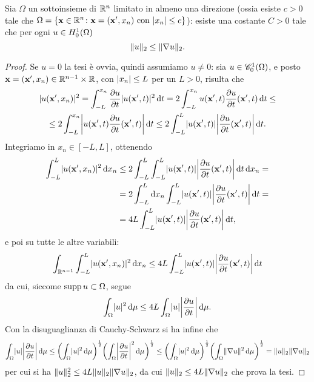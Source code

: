 \begin{teorema} \label{t:disuguaglianza-poincare}
    Sia $\Omega$ un sottoinsieme di $\R^n$ limitato in almeno una direzione (ossia esiste $c>0$ tale che $\Omega=\{\vec x\in\R^n\colon\vec x=(\vec x',x_n)\text{ con }\abs{x_n}\le c\}$): esiste una costante $C>0$ tale che per ogni $u\in\sobHc[1]{\Omega}$
    \begin{equation}
        \norm{u}_2\le\norm{\grad u}_2.
        \label{eq:disuguaglianza-poincare}
    \end{equation}
\end{teorema}
\begin{proof}
    Se $u=0$ la tesi è ovvia, quindi assumiamo $u\ne 0$: sia $u\in\contsc[1]{\Omega}$, e posto $\vec x=(\vec x',x_n)\in\R^{n-1}\times\R$, con $\abs{x_n}\le L$ per un $L>0$, risulta che
    \begin{multline}
        \abs{u(\vec x',x_n)}^2=
        \int_{-L}^{x_n}\drp{u}{t}\abs{u(\vec x',t)}^2\,\dd t=
        2\int_{-L}^{x_n}u(\vec x',t)\drp{u}{t}(\vec x',t)\,\dd t\le\\ \le
        2\int_{-L}^{x_n}\abs[\bigg]{u(\vec x',t)\drp{u}{t}(\vec x',t)}\,\dd t\le
        2\int_{-L}^L\abs{u(\vec x',t)}\abs[\bigg]{\drp{u}{t}(\vec x',t)}\,\dd t.
    \end{multline}
    Integriamo in $x_n\in[-L,L]$, ottenendo
    \begin{equation}
        \begin{split}
            \int_{-L}^L\abs{u(\vec x',x_n)}^2\,\dd x_n&\le
            2\int_{-L}^L\int_{-L}^L\abs{u(\vec x',t)}\abs[\bigg]{\drp{u}{t}(\vec x',t)}\,\dd t\,\dd x_n=\\ &=
            2\int_{-L}^L\dd x_n \int_{-L}^L\abs{u(\vec x',t)}\abs[\bigg]{\drp{u}{t}(\vec x',t)}\,\dd t=\\ &=
            4L\int_{-L}^L\abs{u(\vec x',t)}\abs[\bigg]{\drp{u}{t}(\vec x',t)}\,\dd t,
        \end{split}
    \end{equation}
    e poi su tutte le altre variabili:
    \begin{equation}
        \int_{\R^{n-1}}\int_{-L}^L\abs{u(\vec x',x_n)}^2\,\dd x_n\le 4L\int_{-L}^L\abs{u(\vec x',t)}\abs[\bigg]{\drp{u}{t}(\vec x',t)}\,\dd t
    \end{equation}
    da cui, siccome $\supp u\subset\Omega$, segue
    \begin{equation}
        \int_\Omega\abs{u}^2\,\dd\mu\le 4L\int_\Omega\abs{u}\abs[\bigg]{\drp{u}{t}}\,\dd\mu.
    \end{equation}
    Con la disuguaglianza di Cauchy-Schwarz si ha infine che
    \begin{equation}
        \int_\Omega\abs{u}\abs[\bigg]{\drp{u}{t}}\,\dd\mu\le
        \biggl(\int_\Omega\abs{u}^2\,\dd\mu\biggr)^\frac12\biggl(\int_\Omega\abs[\bigg]{\drp{u}{t}}^2\,\dd\mu\biggr)^\frac12\le
        \biggl(\int_\Omega\abs{u}^2\,\dd\mu\biggr)^\frac12\biggl(\int_\Omega\norm{\grad u}^2\,\dd\mu\biggr)^\frac12=
        \norm{u}_2\norm{\grad u}_2
    \end{equation}
    per cui si ha $\norm{u}_2^2\le 4L\norm{u}_2\norm{\grad u}_2$, da cui $\norm{u}_2\le 4L\norm{\grad u}_2$ che prova la tesi.
\end{proof}
